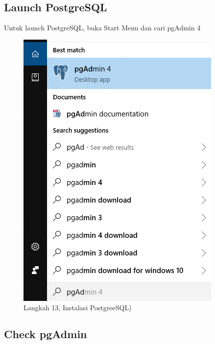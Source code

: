 \documentclass[
]{book}
\begin{document}
\hypertarget{launch-postgresql}{%
\subsection{Launch PostgreSQL}\label{launch-postgresql}}

Untuk launch PostgreSQL, buka Start Menu dan cari pgAdmin 4

\begin{figure}

{\centering \includegraphics[width=1\linewidth]{./images/Bab1/Postgree12} 

}

\caption{Langkah 13, Instalasi PostgreeSQL)}\label{fig:install-posrgree13}
\end{figure}

\hypertarget{check-pgadmin}{%
\subsection{Check pgAdmin}\label{check-pgadmin}}
\end{document}
